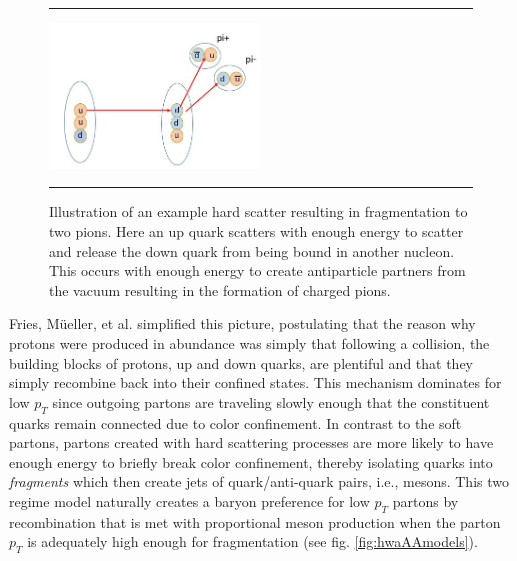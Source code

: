 \begin{figure}[htbp!]
  \centering    \rule{35em}{0.5pt}
    \includegraphics[width=0.5\textwidth]{Figures/fragmentationdiag.JPG}

  \caption[Illustration of an example hard scatter resulting in fragmentation to two pions]{Illustration of an example hard scatter resulting in fragmentation to two pions. Here an up quark scatters with enough energy to scatter and release the down quark from being bound in another nucleon. This occurs with enough energy to create antiparticle partners from the vacuum resulting in the formation of charged pions.}
  \label{fig:fragmentationdiag}    \rule{35em}{0.5pt}
\end{figure} 
Fries, M{\"u}eller, et al. simplified this picture, postulating that the reason why protons were produced in abundance was simply that following a collision, the building blocks of protons, up and down quarks, are plentiful and that they simply recombine back into their confined states. This mechanism dominates for low $p_{T}$ since outgoing partons are traveling slowly enough that the constituent quarks remain connected due to color confinement. In contrast to the soft partons, partons created with hard scattering processes are more likely to have enough energy to briefly break color confinement, thereby isolating quarks into \textit{fragments} which then create jets of quark/anti-quark pairs, i.e., mesons. This two regime model naturally creates a baryon preference for low $p_{T}$ partons by recombination that is met with proportional meson production when the parton $p_{T}$ is adequately high enough for fragmentation (see fig. \ref{fig:hwaAAmodels}).


